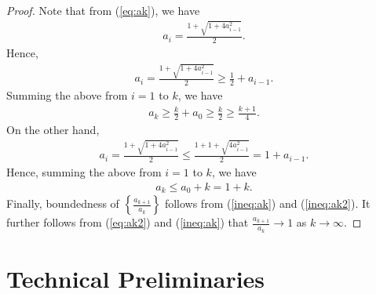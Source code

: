 \documentclass[11pt]{article}
\begin{document}
\begin{proof}
Note that from (\ref{eq:ak}), we have
\begin{eqnarray}\label{eq:ak2}
a_{i} = \frac{1 + \sqrt{1 + 4a_{i-1}^2}}{2}.
\end{eqnarray}
Hence, 
\begin{eqnarray*}
a_{i}  = \frac{1 + \sqrt{1 + 4 a_{i-1}^2}}{2} \geq \frac{1}{2} + a_{i-1}.
\end{eqnarray*}
Summing the above from $i = 1$ to $k$, we have
\begin{eqnarray*}
a_{k} \geq \frac{k}{2} + a_{0} \geq \frac{k}{2} \geq \frac{k+1}{4}.
\end{eqnarray*}
On the other hand,
\begin{eqnarray}\label{ineq:ak3}
a_{i} = \frac{1 + \sqrt{1 +  4 a_{i-1}^2}}{2} \leq \frac{ 1 + 1 + \sqrt{4a_{i-1}^2}}{2}  
=  1 + a_{i-1}.  
\end{eqnarray}
Hence, summing the above from $i = 1$ to $k$, we have
\begin{eqnarray*}
a_{k} \leq a_0 + k = 1 + k.
\end{eqnarray*}
Finally, boundedness of $\displaystyle \left\{ \frac{a_{k+1}}{a_{k}} \right\}$ follows from (\ref{ineq:ak}) and (\ref{ineq:ak2}).    It further follows from (\ref{eq:ak2}) and (\ref{ineq:ak}) that $\displaystyle \frac{a_{k+1}}{a_{k}} \rightarrow 1$ as $k \rightarrow \infty$.
\end{proof}

\section{Technical Preliminaries}\label{sec:technical}
\end{document}
